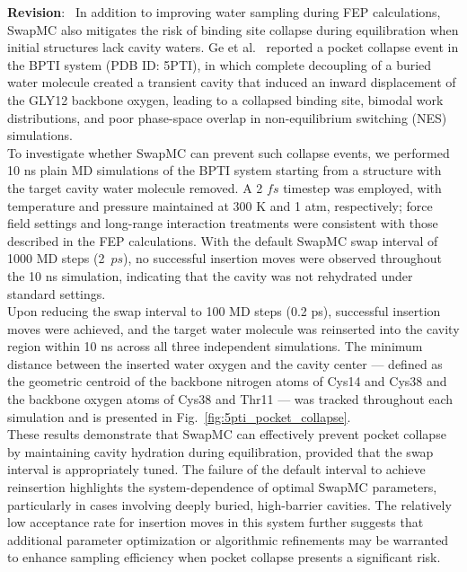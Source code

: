 \documentclass[doublespace,prb,aps]{article}
\newenvironment{revision}
   {\medskip \noindent \color{blue} \begin{sf}\textbf{Revision}:\textit{\ }}
   {\medskip \par \end{sf}}
\begin{document}
\begin{revision}
In addition to improving water sampling during FEP calculations, 
SwapMC also mitigates the risk of binding site collapse during equilibration when initial structures lack cavity waters. 
Ge et al.~\cite{Ge2022} reported a pocket collapse event in the BPTI system (PDB ID: 5PTI), 
in which complete decoupling of a buried water molecule created a transient cavity that induced an inward displacement of the GLY12 backbone oxygen, 
leading to a collapsed binding site, bimodal work distributions, 
and poor phase-space overlap in non-equilibrium switching (NES) simulations. \\
\newline
To investigate whether SwapMC can prevent such collapse events, 
we performed 10 ns plain MD simulations of the BPTI system starting from a structure with the target cavity water molecule removed. 
A 2 $fs$ timestep was employed, with temperature and pressure maintained at 300 K and 1 atm, respectively; 
force field settings and long-range interaction treatments were consistent with those described in the FEP calculations. 
With the default SwapMC swap interval of 1000 MD steps (2~$ps$), 
no successful insertion moves were observed throughout the 10 ns simulation, 
indicating that the cavity was not rehydrated under standard settings. \\
\newline
Upon reducing the swap interval to 100 MD steps (0.2 ps), successful insertion moves were achieved, 
and the target water molecule was reinserted into the cavity region within 10 ns across all three independent simulations. 
The minimum distance between the inserted water oxygen and the cavity center 
— defined as the geometric centroid of the backbone nitrogen atoms of Cys14 and Cys38 and the backbone oxygen atoms of Cys38 and Thr11 
— was tracked throughout each simulation and is presented in Fig.~\ref{fig:5pti_pocket_collapse}. \\
\newline
These results demonstrate that SwapMC can effectively prevent pocket collapse by maintaining cavity hydration during equilibration, 
provided that the swap interval is appropriately tuned. 
The failure of the default interval to achieve reinsertion highlights the system-dependence of optimal SwapMC parameters, 
particularly in cases involving deeply buried, high-barrier cavities. 
The relatively low acceptance rate for insertion moves in this system further suggests that additional parameter optimization or algorithmic refinements 
may be warranted to enhance sampling efficiency when pocket collapse presents a significant risk.


\end{revision}
\end{document}
